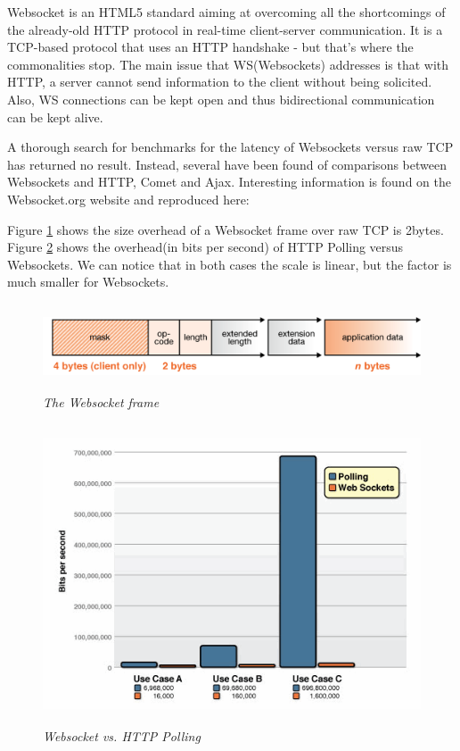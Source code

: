 
Websocket is an HTML5 standard aiming at overcoming all the shortcomings of the
already-old HTTP protocol in real-time client-server communication. It is a
TCP-based protocol that uses an HTTP handshake - but that's where the
commonalities stop. The main issue that WS(Websockets) addresses is that with
HTTP, a server cannot send information to the client without being solicited.
Also, WS connections can be kept open and thus bidirectional communication can
be kept alive.\newline

A thorough search for benchmarks for the latency of Websockets versus raw TCP
has returned no result. Instead, several have been found of comparisons between
Websockets and HTTP, Comet and Ajax. Interesting information is found on the
Websocket.org website and reproduced here: \newline

Figure \ref{fig:websocket_frame} shows the size overhead of a Websocket frame
over raw TCP is 2bytes. Figure \ref{fig:websocket_ws_vs_polling} shows the
overhead(in bits per second) of HTTP Polling versus Websockets. We can notice
that in both cases the scale is linear, but the factor is much smaller for
Websockets.\newline

\begin{figure}
\includegraphics[height=1in,width=7.12in]{./images/websockets/WebSocketFrame.png}  
\caption{\small \sl The Websocket frame \label{fig:websocket_frame}}
\end{figure}

\begin{figure}
\includegraphics[height=3.5in,width=6.23in]{./images/websockets/poll-ws-compare.png}  
\caption{\small \sl Websocket vs. HTTP Polling
\label{fig:websocket_ws_vs_polling}}
\end{figure}

